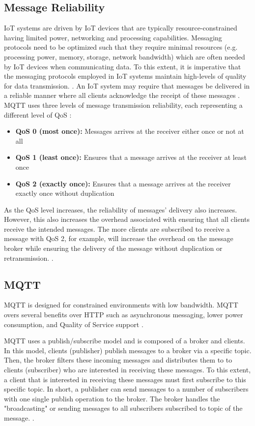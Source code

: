 \subsection{Message Reliability}
\ac{IoT} systems are driven by \ac{IoT} devices that are typically resource-constrained having limited power, networking and processing capabilities. Messaging protocols need to be optimized such that they require minimal resources (e.g. processing power, memory, storage, network bandwidth) which are often needed by IoT devices when communicating data. To this extent, it is imperative that the messaging protocols employed in IoT systems maintain high-levels of quality for data transmission. \cite[15]{protocols}. An IoT system may require that messages be delivered in a reliable manner where all clients acknowledge the receipt of these messages \cite[11]{protocols}. MQTT uses three levels of message transmission reliability, each representing a different level of \ac{QoS} \cite[12]{serialisation}:
\begin{itemize}
    \item \textbf{QoS 0 (most once):} Messages arrives at the receiver either once or not at all \cite[11]{serialisation}
    \item \textbf{QoS 1 (least once):} Ensures that a message arrives at the receiver at least once \cite[11]{serialisation}
    \item \textbf{QoS 2 (exactly once):} Ensures that a message arrives at the receiver exactly once without duplication \cite[11]{serialisation}
\end{itemize}

As the QoS level increases, the reliability of messages’ delivery also increases. However, this also increases the overhead associated with ensuring that all clients receive the intended messages. The more clients are subscribed to receive a message with QoS 2, for example, will increase the overhead on the message broker while ensuring the delivery of the message without duplication or
retransmission. \cite[11]{protocols}.

\subsection{MQTT}
MQTT is designed for constrained environments with low bandwidth. MQTT overs several benefits over HTTP such as asynchronous messaging, lower power consumption, and Quality of Service support \cite[23, 27]{protocols}. 

MQTT uses a publish/subscribe model and is composed of a broker and clients. In this model, clients (publisher) publish messages to a broker via a specific topic. Then, the broker filters these incoming messages and distributes them to to clients (subscriber) who are interested in receiving these messages. To this extent, a client that is interested in receiving these messages must first subscribe to this specific topic. In short, a publisher can send messages to a number of subscribers with one single publish operation to the broker. The broker handles the "broadcasting" or sending messages to all subscribers subscribed to topic of the message. \cite[10]{protocols} \cite[12]{serialisation}. 

